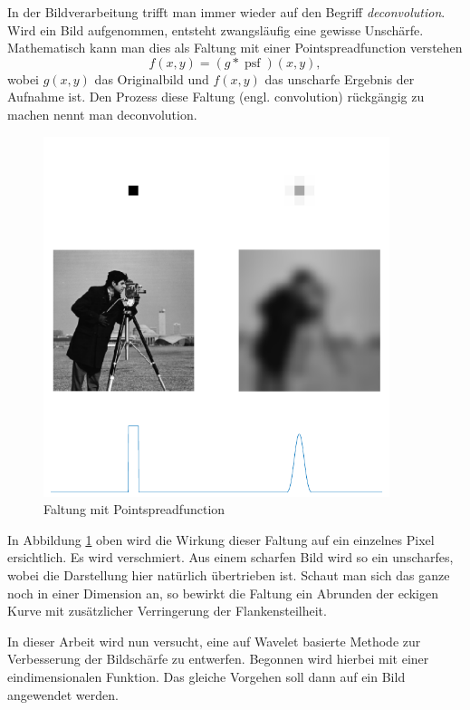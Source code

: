 In der Bildverarbeitung trifft man immer wieder auf den Begriff {\em deconvolution}.
Wird ein Bild aufgenommen, entsteht zwangsläufig eine gewisse Unschärfe.
Mathematisch kann man dies als Faltung mit einer Pointspreadfunction verstehen
$$f(x,y) = (g*\operatorname{psf})(x,y),$$
wobei $g(x,y)$ das Originalbild und $f(x,y)$ das unscharfe Ergebnis der Aufnahme ist.
Den Prozess diese Faltung (engl. convolution) rückgängig zu machen nennt man deconvolution.
\begin{figure}[h]
\centering
\includegraphics[width=0.9\textwidth]{./papers/deconvolve/pictures/psf.pdf}
\caption{Faltung mit Pointspreadfunction\label{deconvolve:pic}}
\end{figure}

In Abbildung \ref{deconvolve:pic} oben wird die Wirkung dieser Faltung auf ein einzelnes Pixel ersichtlich.
Es wird \glqq verschmiert\grqq{}.
Aus einem scharfen Bild wird so ein unscharfes, wobei die Darstellung hier natürlich übertrieben ist.
Schaut man sich das ganze noch in einer Dimension an, so bewirkt die Faltung ein Abrunden der eckigen Kurve mit zusätzlicher Verringerung der Flankensteilheit.

In dieser Arbeit wird nun versucht, eine auf Wavelet basierte Methode zur Verbesserung der Bildschärfe zu entwerfen.
Begonnen wird hierbei mit einer eindimensionalen Funktion.
Das gleiche Vorgehen soll dann auf ein Bild angewendet werden.
